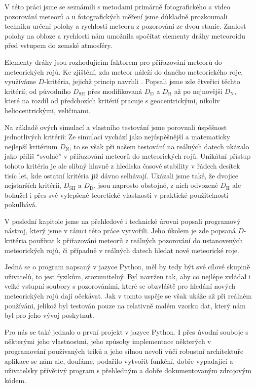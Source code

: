 V této práci jsme se seznámili s metodami primárně fotografického a video pozorování meteorů a u fotografických měření jsme důkladně prozkoumali techniku určení polohy a rychlosti meteoru z pozorování ze dvou stanic. Znalost polohy na obloze a rychlosti nám umožnila spočítat elementy dráhy meteoroidu před vstupem do zemské atmosféry.

\medskip

Elementy dráhy jsou rozhodujícím faktorem pro přiřazování meteorů do meteorických rojů. Ke zjištění, zda meteor náleží do daného meteorického roje, využíváme $D$-kritéria, jejichž princip navrhli \citeauthor{dsh}. Popsali jsme zde čtveřici těchto kritérií; od původního $D_\text{SH}$ přes modifikovaná $D_\text{D}$ a $D_\text{H}$ až po nejnovější $D_\text{N}$, které na rozdíl od předchozích kritérií pracuje s geocentrickými, nikoliv heliocentrickými, veličinami.

Na základě \citeauthor{galligan}ových simulací a vlastního testování jsme porovnali úspěšnost jednotlivých kritérií: Ze simulací vychází jako nejúspěšnější a matematicky nejlepší kritérium $D_\text{N}$, to se však při našem testování na reálných datech ukázalo jako příliš "`svolné"' v přiřazování meteorů do meteorických rojů. Unikátní přístup tohoto kritéria je ale slibný hlavně z hlediska časové stability v řádech desítek tisíc let, kde ostatní kritéria již dávno selhávají. Ukázali jsme také, že dvojice nejstarších kritérií, $D_\text{SH}$ a $D_\text{D}$, jsou naprosto obstojné, z nich odvozené $D_\text{H}$ ale bohužel i přes své vylepšené teoretické vlastnosti v praktické použitelnosti pokulhává.

\medskip

V poslední kapitole jsme na přehledové i technické úrovni popsali programový nástroj, který jsme v rámci této práce vytvořili. Jeho úkolem je zde popsaná $D$-kritéria používat k přiřazování meteorů z reálných pozorování do ustanovených meteorických rojů, či případně v reálných datech hledat nové meteorické roje.

Jedná se o program napsaný v jazyce Python, měl by tedy být své cílové skupině uživatelů, to jest fyzikům, srozumitelný. Byl navržen tak, aby co nejlépe zvládal i velké vstupní soubory s pozorováními, které se obzvláště pro hledání nových meteorických rojů dají očekávat. Jak v tomto uspěje se však ukáže až při reálném používáni, jelikož byl testován pouze na relativně malém vzorku dat, který nám byl pro jeho vývoj poskytnut.

\smallskip

Pro nás se také jednalo o první projekt v jazyce Python. I přes úvodní souboje s některými jeho vlastnostmi, jeho způsoby implementace některých v programování používaných triků a jeho silnou nevolí vůči robustní architektuře aplikace se nám ale, doufáme, podařilo vytvořit funkční, dobře vypadající a uživatelsky přívětivý program s přehledným a dobře dokumentovaným zdrojovým kódem.
% 
